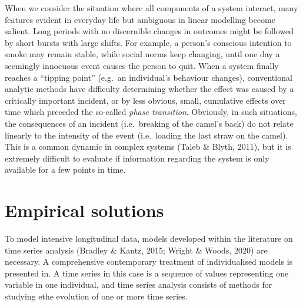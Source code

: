 \documentclass[
  british,
  man,floatsintext]{apa6}
\begin{document}
When we consider the situation where all components of a system interact, many features evident in everyday life but ambiguous in linear modelling become salient. Long periods with no discernible changes in outcomes might be followed by short bursts with large shifts. For example, a person's conscious intention to smoke may remain stable, while social norms keep changing, until one day a seemingly innocuous event causes the person to quit. When a system finally reaches a \enquote{tipping point} (e.g.~an individual's behaviour changes), conventional analytic methods have difficulty determining whether the effect was caused by a critically important incident, or by less obvious, small, cumulative effects over time which preceded the so-called \emph{phase transition}. Obviously, in such situations, the consequences of an incident (i.e.~breaking of the camel's back) do not relate linearly to the intensity of the event (i.e.~loading the last straw on the camel). This is a common dynamic in complex systems (Taleb \& Blyth, 2011), but it is extremely difficult to evaluate if information regarding the system is only available for a few points in time.

\hypertarget{empirical-solutions}{%
\section{Empirical solutions}\label{empirical-solutions}}

To model intensive longitudinal data, models developed within the literature on time series analysis (Bradley \& Kantz, 2015; Wright \& Woods, 2020) are necessary. A comprehensive contemporary treatment of individualised models is presented in. A time series in this case is a sequence of values representing one variable in one individual, and time series analysis consists of methods for studying ethe evolution of one or more time series.
\end{document}
